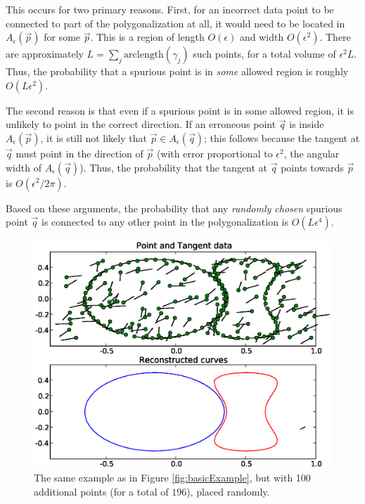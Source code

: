 \documentclass{article}
\numberwithin{cntr}{section}
\numberwithin{equation}{section}
\newcommand{\vp}[0]{{\vec{p}}}
\newcommand{\vq}[0]{{\vec{q}}}
\newcommand{\allowed}[2]{ { A_{#1}(#2) } }
\begin{document}
This occurs for two primary reasons. First, for an incorrect data point to be connected to part of the polygonalization at all, it would need to be located in $\allowed{\epsilon}{\vp}$ for some $\vp$. This is a region of length $O(\epsilon)$ and width $O(\epsilon^{2})$. There are approximately $L = \sum_{j} \textrm{arclength}(\gamma_{j})$ such points, for a total volume of $\epsilon^{2} L$. Thus, the probability that a spurious point is in \emph{some} allowed region is roughly $O(L \epsilon^{2})$.

The second reason is that even if a spurious point is in some allowed region, it is unlikely to point in the correct direction. If an erroneous point $\vq$ is inside $\allowed{\epsilon}{\vp}$, it is still not likely that $\vp \in \allowed{\epsilon}{\vq}$; this follows because the tangent at $\vq$ must point in the direction of $\vp$ (with error proportional to $\epsilon^{2}$, the angular width of $\allowed{\epsilon}{\vq}$). Thus, the probability that the tangent at $\vq$ points towards $\vp$ is $O(\epsilon^{2}/2\pi)$.

Based on these arguments, the probability that any \emph{randomly chosen} spurious point $\vq$ is connected to any other point in the polygonalization is $O(L \epsilon^{4})$.

\begin{figure}
\setlength{\unitlength}{0.240900pt}
\ifx\plotpoint\undefined\newsavebox{\plotpoint}\fi
\sbox{\plotpoint}{\rule[-0.200pt]{0.400pt}{0.400pt}}%
\includegraphics[scale=0.5]{noisy_example.eps}

\caption{The same example as in Figure \ref{fig:basicExample}, but with 100 additional points (for a total of $196$), placed randomly. }
\label{fig:noisyExample}
\end{figure}
\end{document}
